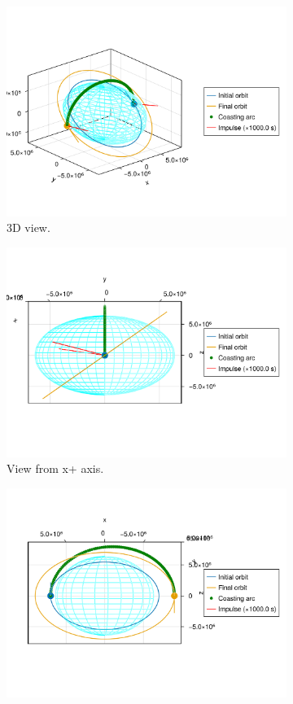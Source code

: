 \begin{figure}[htbp]
    \centering
    \begin{subfigure}{0.49\linewidth}
        \includegraphics[width=0.8\linewidth]{../results/j2/hohmann/ICI_3d.png}
        \caption{3D view.}
    \end{subfigure}
    \begin{subfigure}{0.49\linewidth}
        \includegraphics[width=0.8\linewidth]{../results/j2/hohmann/ICI_x+.png}
        \caption{View from x+ axis.}
    \end{subfigure}
    \begin{subfigure}{0.49\linewidth}
        \includegraphics[width=0.8\linewidth]{../results/j2/hohmann/ICI_y+.png}

\end{subfigure}
\end{figure}
